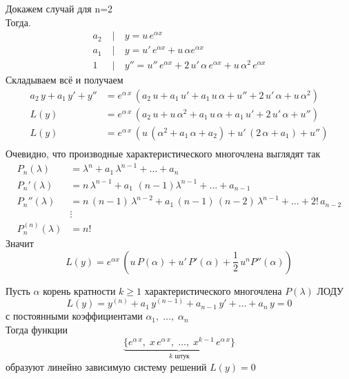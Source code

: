 \begin{Proof}
    Докажем случай для n=2\\
    Тогда.
    \begin{align*}
        a_2\; &| \quad y=u\,e^{\alpha x}\\
        a_1\; &| \quad y=u'\,e^{\alpha x}+u\,\alpha e^{\alpha x}\\
        1\; &| \quad y''=u''\,e^{\alpha x}+2\,u'\,\alpha\,e^{\alpha x}+u\,\alpha^2\,e^{\alpha x} 
    \end{align*}
    Складываем всё и получаем
    \begin{align*}
        a_2\,y + a_1\,y' + y'' &= e^{\alpha\,x}\,(a_2\,u + a_1\,u' + a_1\,u\,\alpha + u'' + 2\,u'\,\alpha + u\,\alpha^2)\\
        L(y) &= e^{\alpha\,x}\,(a_2\,u + u\,\alpha^2 + a_1\,u\,\alpha + a_1\,u' + 2\,u'\,\alpha + u'')\\
        L(y) &= e^{\alpha\,x}\,(u\,(\alpha^2 + a_1\,\alpha + a_2) + u'\,(2\,\alpha + a_1) + u'')\\
    \end{align*}
    Очевидно, что производные характеристического многочлена выглядят так
    \begin{align*}
        P_n(\lambda) &= \lambda^n + a_1\,\lambda^{n - 1} + \dots + a_n\\
        P_n'(\lambda) &= n\,\lambda^{n-1} + a_1\,\,(n - 1)\lambda^{n - 1} + \dots + a_{n-1}\\
        P_n''(\lambda) &= n\,(n-1)\,\lambda^{n - 2} + a_1\,(n-1)\,(n-2)\,\lambda^{n - 1} + \dots + 2!\,a_{n-2}\\
        &\vdots\\
        P_n^{(n)}(\lambda) &= n!
    \end{align*}
    Значит
    \[
        L(y)=e^{\alpha x}\,(u\,P(\alpha)+u'\,P'(\alpha)+\frac{1}{2}\,u^n P''(\alpha))
    \]
\end{Proof}

\begin{Th}
    Пусть $\alpha$ корень кратности $k \geqslant 1$ характеристического многочлена $P(\lambda)$ ЛОДУ
    \[
        L(y)=y^{(n)}+a_1\,y^{(n-1)}+a_{n-1}\,y'+\dots+a_n\,y=0
    \]
    с постоянными коэффициентами $\alpha_1,\; \dots,\; \alpha_n$\\
    Тогда функции 
    \[
        \underbrace{\{e^{\alpha\,x},\; x\,e^{\alpha\,x},\; \dots,\; x^{k-1}\,e^{\alpha\,x}\}}_{k \text{ штук}}
    \]
    образуют линейно зависимую систему решений $L(y)=0$
\end{Th}

